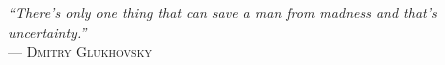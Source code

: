 %



\begin{flushright}
\mbox{}\vfill
{\sffamily\itshape
``There's only one thing that can save a man from madness and that's uncertainty.''\\}
--- \textsc{Dmitry Glukhovsky}
\end{flushright}



\listoffigures

\listoftables




